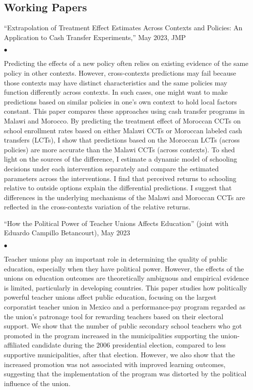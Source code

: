 \documentclass[margin,line]{res}
\newenvironment{list1}{
  \begin{list}{\ding{113}}{%
      \setlength{\itemsep}{.025in}
      \setlength{\parsep}{0in} \setlength{\parskip}{0in}
      \setlength{\topsep}{0in} \setlength{\partopsep}{0in}
      \setlength{\leftmargin}{0.17in}}}{\end{list}}
\newenvironment{list2}{
  \begin{list}{$\bullet$}{%
      \setlength{\itemsep}{0in}
      \setlength{\parsep}{0in} \setlength{\parskip}{0in}
      \setlength{\topsep}{0in} \setlength{\partopsep}{0in}
      \setlength{\leftmargin}{0.2in}}}{\end{list}}
\begin{document}
\begin{resume}
\section{Working Papers}
\begin{list1}
\item[] ``Extrapolation of Treatment Effect Estimates Across Contexts and Policies: An Application to Cash Transfer Experiments,'' May 2023, JMP
\begin{list2}
\item[] Predicting the effects of a new policy often relies on existing evidence of the same policy in other contexts. However, cross-contexts predictions may fail because those contexts may have distinct characteristics and the same policies may function differently across contexts. In such cases, one might want to make predictions based on similar policies in one’s own context to hold local factors constant. This paper compares these approaches using cash transfer programs in Malawi and Morocco. By predicting the treatment effect of Moroccan CCTs on school enrollment rates based on either Malawi CCTs or Moroccan labeled cash transfers (LCTs), I show that predictions based on the Moroccan LCTs (across policies) are more accurate than the Malawi CCTs (across contexts). To shed light on the sources of the difference, I estimate a dynamic model of schooling decisions under each intervention separately and compare the estimated parameters across the interventions. I find that perceived returns to schooling relative to outside options explain the differential predictions. I suggest that differences in the underlying mechanisms of the Malawi and Moroccan CCTs are reflected in the cross-contexts variation of the relative returns. 
\end{list2}
\item[] ``How the Political Power of Teacher Unions Affects Education'' (joint with Eduardo Campillo Betancourt), May 2023
\begin{list2}
\item[] Teacher unions play an important role in determining the quality of public education, especially when they have political power. However, the effects of the unions on education outcomes are theoretically ambiguous and empirical evidence is limited, particularly in developing countries. This paper studies how politically powerful teacher unions affect public education, focusing on the largest corporatist teacher union in Mexico and a performance-pay program regarded as the union’s patronage tool for rewarding teachers based on their electoral support. We show that the number of public secondary school teachers who got promoted in the program increased in the municipalities supporting the union-affiliated candidate during the 2006 presidential election, compared to less supportive municipalities, after that election. However, we also show that the increased promotion was not associated with improved learning outcomes, suggesting that the implementation of the program was distorted by the political influence of the union. \\
\end{list2}
\end{list1}


\end{resume}
\end{document}
